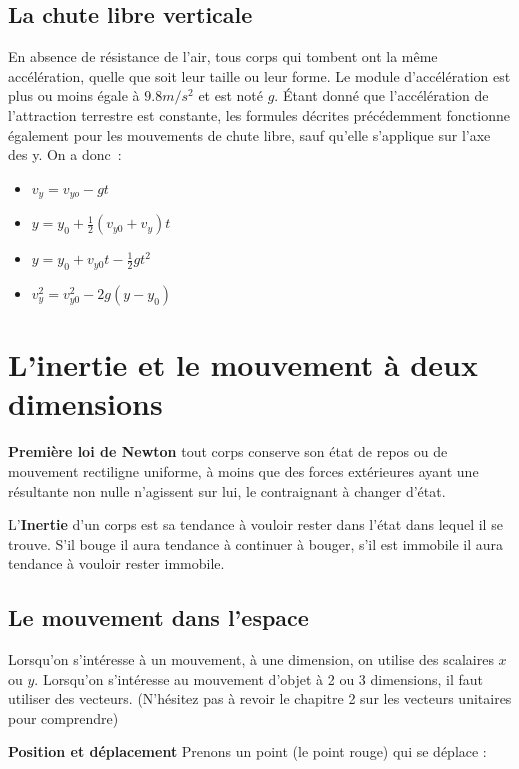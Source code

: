 \documentclass{article}
\begin{document}
\subsection{La chute libre verticale}
En absence de résistance de l'air, tous corps qui tombent ont la même accélération, quelle que soit leur taille ou leur forme. Le module d'accélération est plus ou moins égale à $9.8m/s^2$ et est noté $g$.
Étant donné que l'accélération de l'attraction terrestre est constante, les formules décrites précédemment fonctionne également pour les mouvements de chute libre, sauf qu'elle s'applique sur l'axe des y.
\noindent
On a donc :
\begin{itemize}
    \item $v_y = v_{yo} - gt$
    \item $y = y_0 + \frac{1}{2}(v_{y0} + v_y)t$
    \item $y = y_0 + v_{y0}t - \frac{1}{2}gt^2$
    \item $v^2_y = v^2_{y0} - 2g(y - y_0)$
\end{itemize}

\section{L'inertie et le mouvement à deux dimensions}

\textbf{Première loi de Newton}
tout corps conserve son état de repos ou de mouvement rectiligne uniforme, à moins que des forces extérieures ayant une résultante non nulle n'agissent sur lui, le contraignant à changer d'état.
\newline

L'\textbf{Inertie} d'un corps est sa tendance à vouloir rester dans l'état dans lequel il se trouve. S'il bouge il aura tendance à continuer à bouger, s'il est immobile il aura tendance à vouloir rester immobile.

\subsection{Le mouvement dans l'espace}
Lorsqu'on s'intéresse à un mouvement, à une dimension, on utilise des scalaires $x$ ou $y$. Lorsqu'on s'intéresse au mouvement d'objet à 2 ou 3 dimensions, il faut utiliser des vecteurs. (N'hésitez pas à revoir le chapitre 2 sur les vecteurs unitaires pour comprendre)
\newline

\noindent
\textbf{Position et déplacement}
Prenons un point (le point rouge) qui se déplace :
\end{document}

